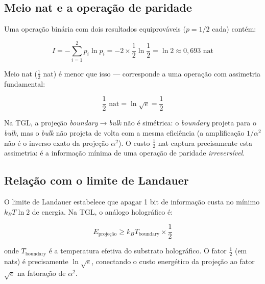 \documentclass[12pt,a4paper,twoside]{article}
\newcommand{\alphaii}{\alpha^{2}}
\newcommand{\boundary}{\textit{boundary}}
\newcommand{\bulk}{\textit{bulk}}
\begin{document}
\subsection{Meio nat e a operação de paridade}

Uma operação binária com dois resultados equiprováveis ($p = 1/2$ cada) contém:

\begin{equation}
I = -\sum_{i=1}^{2} p_i \ln p_i = -2 \times \frac{1}{2} \ln \frac{1}{2} = \ln 2 \approx 0{,}693 \text{ nat}
\end{equation}

Meio nat ($\frac{1}{2}$ nat) é menor que isso --- corresponde a uma operação com assimetria fundamental:

\begin{equation}
\frac{1}{2} \text{ nat} = \ln \sqrt{e} = \frac{1}{2}
\end{equation}

Na TGL, a projeção \boundary$\to$\bulk{} não é simétrica: o \boundary{} projeta para o \bulk{}, mas o \bulk{} não projeta de volta com a mesma eficiência (a amplificação $1/\alphaii$ não é o inverso exato da projeção $\alphaii$). O custo $\frac{1}{2}$ nat captura precisamente esta assimetria: é a informação mínima de uma operação de paridade \textit{irreversível}.

\subsection{Relação com o limite de Landauer}

O limite de Landauer \cite{Landauer1961} estabelece que apagar 1 bit de informação custa no mínimo $k_B T \ln 2$ de energia. Na TGL, o análogo holográfico é:

\begin{equation}
E_{\text{projeção}} \geq k_B T_{\text{boundary}} \times \frac{1}{2}
\end{equation}

\noindent onde $T_{\text{boundary}}$ é a temperatura efetiva do substrato holográfico. O fator $\frac{1}{2}$ (em nats) é precisamente $\ln\sqrt{e}$, conectando o custo energético da projeção ao fator $\sqrt{e}$ na fatoração de $\alphaii$.


\end{document}
